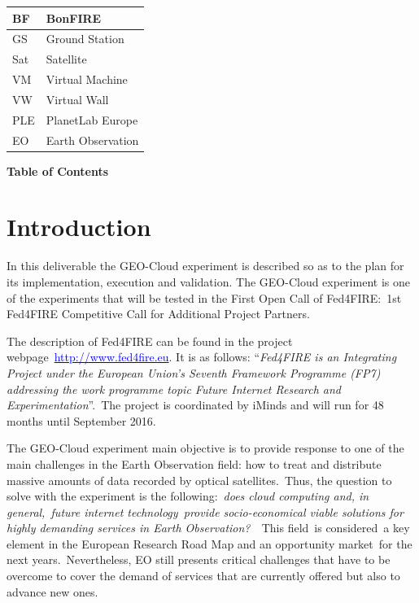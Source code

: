 \documentclass[a4paper]{article}
\newcommand\textstyleHyperlink[1]{\textcolor{blue}{#1}}
\begin{document}
\bigskip

\begin{flushleft}
\tablehead{}
\begin{supertabular}{|m{0.8823598in}|m{5.35596in}|}
\hline
BF &
BonFIRE\\\hline
GS &
Ground Station\\\hline
Sat &
Satellite\\\hline
VM &
Virtual Machine\\\hline
VW &
Virtual Wall\\\hline
PLE &
PlanetLab Europe\\\hline
EO &
Earth Observation\\\hline
\end{supertabular}
\end{flushleft}
\clearpage
\textrm{\textbf{Table of C}}\textrm{\textbf{ontents}}


\bigskip

\setcounter{tocdepth}{3}
\tableofcontents

\bigskip

\section[Introduction]{Introduction}
\hypertarget{Toc378868684}{}
\bigskip

In this deliverable the GEO-Cloud experiment is described so as to the
plan for its implementation, execution and validation. The GEO-Cloud
experiment is one of the experiments that will be tested in the First
Open Call of Fed4FIRE:\ 1st Fed4FIRE Competitive Call for Additional
Project Partners.\ 


\bigskip

The description of Fed4FIRE can be found in the project
webpage\ \href{http://www.fed4fire.eu/home/project-info.html}{\textstyleHyperlink{http://www.fed4fire.eu}}.
It is as follows: {\textquotedblleft}\textit{Fed4FIRE is an Integrating
Project under the European Union{\textquoteright}s Seventh Framework
Programme (FP7) addressing the work programme topic Future
Intern}\textit{et Research and
Experimentation}{\textquotedblright}.\ The project is coordinated by
iMinds and will run for 48 months until September 2016.


\bigskip

The GEO-Cloud experiment main objective is to provide response to one of
the main challenges in the Earth Observation field: how to treat and
distribute massive amounts of data recorded by optical
satellites.\ Thus, the question to solve with the experiment is the
following:\ \textit{does cloud computing and}\textit{, in
general,}\textit{\ future internet
technolog}\textit{y}\textit{\ provide socio-economical viable solutions
for highly demanding services in Earth Observation?}\textit{\ }\ This
field\ is considered\ a key element in the European Research Road Map
and an opportunity market\ for the next years.\ Nevertheless, EO still
presents critical challenges that have to be overcome to cover the
demand of services that are currently offered but also to advance new
ones.\ 
\end{document}
